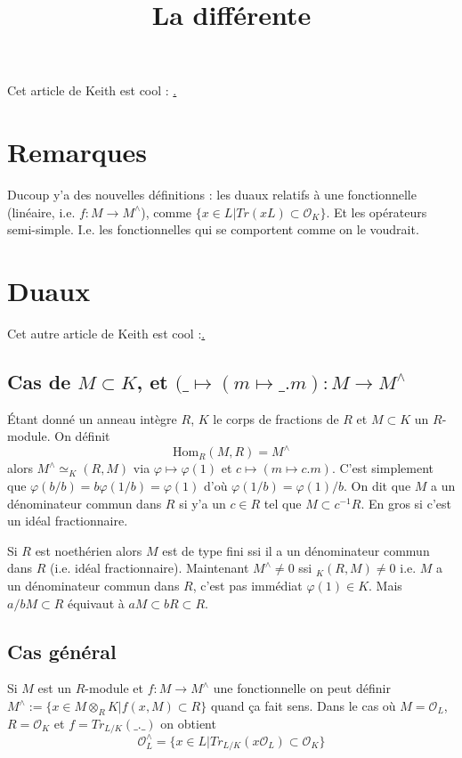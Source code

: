 \documentclass[a4paper,12pt]{book}
\title{La différente}
\date{}
\newcommand{\Or}{\mathcal{O}}
\newcommand{\Hom}{\textrm{Hom}}
\theoremstyle{plain}
\theoremstyle{definition}
\theoremstyle{remark}
\begin{document}
\maketitle
Cet article de Keith est cool : \href{https://kconrad.math.uconn.edu/blurbs/gradnumthy/different.pdf}.

\section{Remarques}
Ducoup y'a des nouvelles définitions : les duaux relatifs à
une fonctionnelle (linéaire, i.e. $f\colon M\to M^\wedge$), comme 
$\{x\in L|Tr(xL)\subset \Or_K\}$. Et les opérateurs semi-simple.
I.e. les fonctionnelles qui se comportent comme on le voudrait.

\section{Duaux}
Cet autre article de Keith est cool :\href{https://kconrad.math.uconn.edu/blurbs/linmultialg/dualmod.pdf}.

\subsection{Cas de $M\subset K$, et $(\_\mapsto (m\mapsto \_.m)\colon M\to M^\wedge$}
Étant donné un anneau intègre $R$, $K$ le corps de fractions de
$R$ et $M\subset K$ un $R$-module. On définit
\[\Hom_R(M,R)=M^\wedge\]
alors $M^\wedge\simeq _K(R,M)$ via $\varphi\mapsto \varphi(1)$
et $c\mapsto (m\mapsto c.m)$. C'est simplement que $\varphi(b/b)=
b\varphi(1/b)=\varphi(1)$ d'où $\varphi(1/b)=\varphi(1)/b$. On dit
que $M$ a un dénominateur commun dans $R$ si y'a un $c\in R$ tel
que $M\subset c^{-1}R$.
En gros si c'est un idéal fractionnaire.

Si $R$ est noethérien alors $M$ est de type fini ssi il a un
dénominateur commun dans $R$ (i.e. idéal fractionnaire).
Maintenant $M^\wedge\ne 0$ ssi $_K(R,M)\ne 0$ i.e. $M$ a un
dénominateur commun dans $R$, c'est pas immédiat $\varphi(1)\in K$.
Mais $a/bM\subset R$ équivaut à $aM\subset bR\subset R$.
\subsection{Cas général}
Si $M$ est un $R$-module et $f\colon M\to M^\wedge$ une fonctionnelle
on peut définir $M^\wedge:=\{x\in M\otimes_R K| f(x,M)\subset R\}$
quand ça fait sens. Dans le cas où $M=\Or_L$, $R=\Or_K$ et $f=Tr_{L/K}(\_.\_)$
on obtient
\[\Or_L^\wedge=\{x\in L| Tr_{L/K}(x\Or_L)\subset \Or_K\}\]
\end{document}

